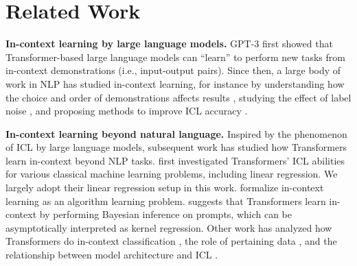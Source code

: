 \documentclass[11pt]{article}
\theoremstyle{plain}
\theoremstyle{definition}
\theoremstyle{remark}
\renewcommand{\^}[1]{^{(#1)}}
\renewcommand{\paragraph}[1]{\vspace{1mm}\noindent\textbf{#1}}
\begin{document}
\fi

\vspace{-1mm}
\section{Related Work} \label{sec:related_work}
\vspace{-1mm}

\paragraph{In-context learning by large language models. }
GPT-3 \citep{brown2020lm} first showed that Transformer-based large language models can ``learn'' to perform new tasks from in-context demonstrations (i.e., input-output pairs).
Since then, a large body of work in NLP has studied in-context learning, for instance by understanding how the choice and order of demonstrations affects results \citep{lu-etal-2022-fantastically,liu-etal-2022-makes,rubin-etal-2022-learning,su2023selective,chang-jia-2023-data,nguyen2023context}, studying the effect of label noise \citep{min-etal-2022-rethinking,yoo-etal-2022-ground,wei2023larger}, and proposing methods to improve ICL accuracy \citep{zhao2021calibrate,min-etal-2022-noisy,min-etal-2022-metaicl}.

\paragraph{In-context learning beyond natural language. }
Inspired by the phenomenon of ICL by large language models, subsequent work has studied how Transformers learn in-context beyond NLP tasks.
\citet{Garg2022WhatCT} first investigated Transformers' ICL abilities for various classical machine learning problems, including linear regression. 
We largely adopt their linear regression setup in this work.
\citet{Li2023TransformersAA} formalize in-context learning as an algorithm learning problem.
\citet{han2023incontext} suggests that Transformers learn in-context by performing Bayesian inference on prompts, which can be asymptotically interpreted as kernel regression. 
Other work has analyzed how Transformers do in-context classification \citep{AtaeeTarzanagh2023TransformersAS,tarzanagh2023maxmargin,Zhang2023TrainedTL}, the role of pertaining data \citep{raventós2023pretraining}, and the relationship between model architecture and ICL \citep{lee2023exploring}.
\end{document}
